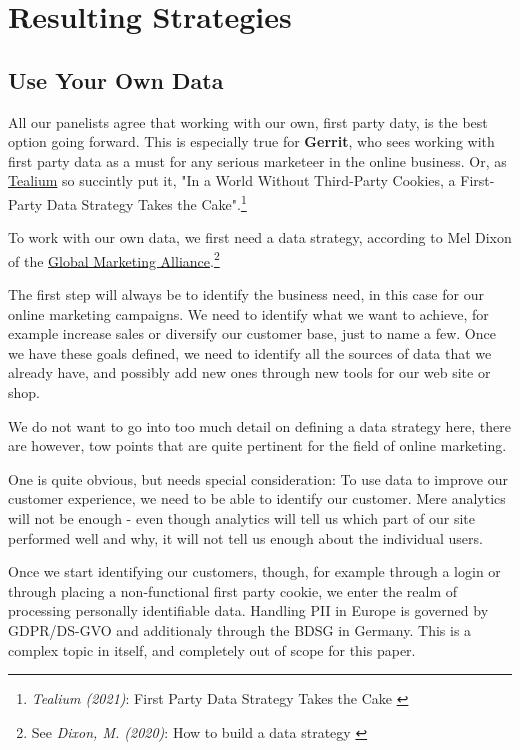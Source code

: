 %
%

\pagebreak
\section{Resulting Strategies}

\onehalfspacing

\subsection{Use Your Own Data}

All our panelists agree that working with our own, first party daty, is the best option going forward. This is especially true for \textbf{Gerrit}, who sees working with first party data as a must for any serious marketeer in the online business. Or, as \href{https://tealium.com/}{Tealium} so succintly put it, "In a World Without Third-Party Cookies, a First-Party Data Strategy Takes the Cake".\footnote{\textit{Tealium (2021)}: First Party Data Strategy Takes the Cake \cite{firstCake}}

To work with our own data, we first need a data strategy, according to Mel Dixon of the \href{https://www.the-gma.com/}{Global Marketing Alliance}.\footnote{See \textit{Dixon, M. (2020)}: How to build a data strategy \cite{dataStrategy}}

The first step will always be to identify the business need, in this case for our online marketing campaigns. We need to identify what we want to achieve, for example increase sales or diversify our customer base, just to name a few. Once we have these goals defined, we need to identify all the sources of data that we already have, and possibly add new ones through new tools for our web site or shop.

We do not want to go into too much detail on defining a data strategy here, there are however, tow points that are quite pertinent for the field of online marketing.

One is quite obvious, but needs special consideration: To use data to improve our customer experience, we need to be able to identify our customer. Mere analytics will not be enough - even though analytics will tell us which part of our site performed well and why, it will not tell us enough about the individual users.

Once we start identifying our customers, though, for example through a login or through placing a non-functional first party cookie, we enter the realm of processing personally identifiable data. Handling PII in Europe is governed by GDPR/DS-GVO and additionaly through the BDSG in Germany. This is a complex topic in itself, and completely out of scope for this paper.


